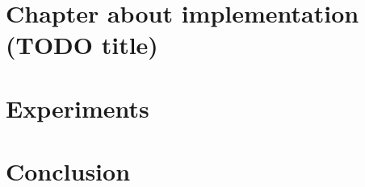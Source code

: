 \documentclass{template/EPL-master-thesis-covers-EN}
\begin{document}
  
  
  

  \chapter{Chapter about implementation (TODO title)}

  \chapter{Experiments}

  \chapter{Conclusion}

   
  

  \backcoverpage
\end{document}
